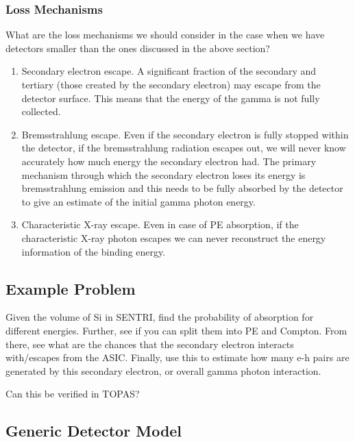 \documentclass{article}
\begin{document}
\subsubsection{Loss Mechanisms}

What are the loss mechanisms we should consider in the case when we have detectors smaller than the ones discussed in the above section?

\begin{enumerate}
    \item Secondary electron escape. A significant fraction of the secondary and tertiary (those created by the secondary electron) may escape from the detector surface. This means that 
    the energy of the gamma is not fully collected. 
    \item Bremsstrahlung escape. Even if the secondary electron is fully stopped within the detector, if the bremsstrahlung radiation escapes out, we will never know accurately how much energy the secondary electron had. The primary 
    mechanism through which the secondary electron loses its energy is bremsstrahlung emission and this needs to be fully absorbed by the detector to give an estimate of the initial gamma photon energy.
    \item Characteristic X-ray escape. Even in case of PE absorption, if the characteristic X-ray photon escapes we can never reconstruct the energy information of the binding energy.
\end{enumerate}






\subsection{Example Problem}

Given the volume of Si in SENTRI, find the probability of absorption for different energies. Further, see if you can split them into PE and Compton.
From there, see what are the chances that the secondary electron interacts with/escapes from the ASIC. Finally, use this to estimate how many e-h pairs are generated by this secondary electron, or overall gamma photon interaction.

Can this be verified in TOPAS?





\subsection{Generic Detector Model}
\end{document}
